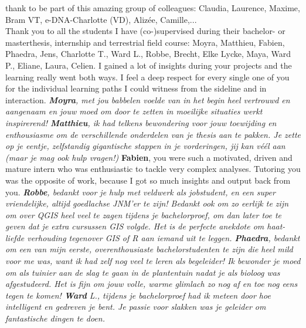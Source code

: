 \documentclass[10pt, twoside]{book} %
\begin{document}
\begin{small}
thank to be part of this amazing group of colleagues: Claudia, Laurence, Maxime, Bram VT, e-DNA-Charlotte (VD), Aliz\'{e}e, Camille,...\\

Thank you to all the students I have (co-)supervised during their bachelor- or masterthesis, internship and terrestrial field course: Moyra, Matthieu, Fabien, Phaedra, Jens, Charlotte T., Ward L., Robbe, Brecht, Elke Lycke, Maya, Ward P., Eliane, Laura, Celien. I gained a lot of insights during your projects and the learning really went both ways. I feel a deep respect for every single one of you for the individual learning paths I could witness from the sideline and in interaction. \textit{\textbf{Moyra}, met jou babbelen voelde van in het begin heel vertrouwd en aangenaam en jouw moed om door te zetten in moeilijke situaties werkt inspirerend! \textbf{Matthieu}, ik had telkens bewondering voor jouw toewijding en enthousiasme om de verschillende onderdelen van je thesis aan te pakken. Je zette op je eentje, zelfstandig gigantische stappen in je vorderingen, jij kan véél aan (maar je mag ook hulp vragen!)} \textbf{Fabien}, you were such a motivated, driven and mature intern who was enthusiastic to tackle very complex analyses. Tutoring you was the opposite of work, because I got so much insights and output back from you. \textit{\textbf{Robbe}, bedankt voor je hulp met veldwerk als jobstudent, en een super vriendelijke, altijd goedlachse JNM'er te zijn! Bedankt ook om zo eerlijk te zijn om over QGIS heel veel te zagen tijdens je bachelorproef, om dan later toe te geven dat je extra cursussen GIS volgde. Het is de perfecte anekdote om haat-liefde verhouding tegenover GIS of R aan iemand uit te leggen. \textbf{Phaedra}, bedankt om een van mijn eerste, overenthousiaste bachelorstudenten te zijn die heel mild voor me was, want ik had zelf nog veel te leren als begeleider! Ik bewonder je moed om als tuinier aan de slag te gaan in de plantentuin nadat je als bioloog was afgestudeerd. Het is fijn om jouw volle, warme glimlach zo nog af en toe nog eens tegen te komen! \textbf{Ward} L., tijdens je bachelorproef had ik meteen door hoe intelligent en gedreven je bent. Je passie voor slakken was je geleider om fantastische dingen te doen.}\\


\end{small}
\end{document}
